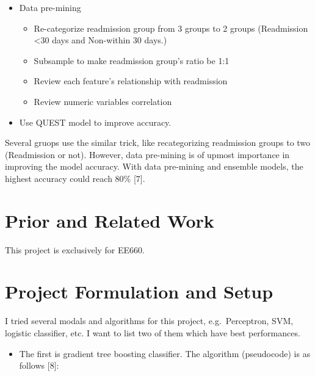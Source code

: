 \documentclass[]{article}
\begin{document}
\begin{itemize}
\itemsep1pt\parskip0pt
\item
  Data pre-mining

  \begin{itemize}
  \itemsep1pt\parskip0pt
  \item
    Re-categorize readmission group from 3 groups to 2 groups
    (Readmission \textless{}30 days and Non-within 30 days.)
  \item
    Subsample to make readmission group's ratio be 1:1
  \item
    Review each feature's relationship with readmission
  \item
    Review numeric variables correlation
  \end{itemize}
\item
  Use QUEST model to improve accuracy.
\end{itemize}

Several gruops use the similar trick, like recategorizing readmission
groups to two (Readmission or not). However, data pre-mining is of
upmost importance in improving the model accuracy. With data pre-mining
and ensemble models, the highest accuracy could reach 80\% {[}7{]}.

\section{Prior and Related Work}\label{prior-and-related-work}

This project is exclusively for EE660.

\section{Project Formulation and
Setup}\label{project-formulation-and-setup}

I tried several modals and algorithms for this project, e.g.~Perceptron,
SVM, logistic classifier, etc. I want to list two of them which have
best performances.

\begin{itemize}
\itemsep1pt\parskip0pt
\item
  The first is gradient tree boosting classifier. The algorithm
  (pseudocode) is as follows {[}8{]}:
\end{itemize}
\end{document}
